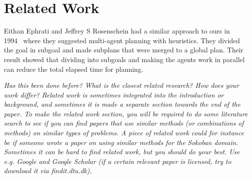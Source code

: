 \section{Related Work}
\label{sec:related work}

Eithan Ephrati and Jeffrey S Rosenschein had a similar approach to ours in
1994~\cite{ephrati1994divide} where they suggested multi-agent planning with
heuristics. They divided the goal in subgoal and made subplans that were merged
to a global plan. Their result showed that dividing into subgoals and making the
agents work in parallel can reduce the total elapsed time for planning.




\emph{Has this been done before? What is the closest related research? How does your work differ? Related work is sometimes integrated into the introduction or background, and sometimes it is made a separate section towards the end of the paper.  To make the related work section, you will be required to do some literature search to see if you can find papers that use similar methods (or combinations of methods) on similar types of problems. A piece of related work could for instance be if someone wrote a paper on using similar methods for the Sokoban domain. Sometimes it can be hard to find related work, but you should do your best. Use e.g. Google and Google Scholar (if a certain relevant paper is licensed, try to download it via findit.dtu.dk).}


